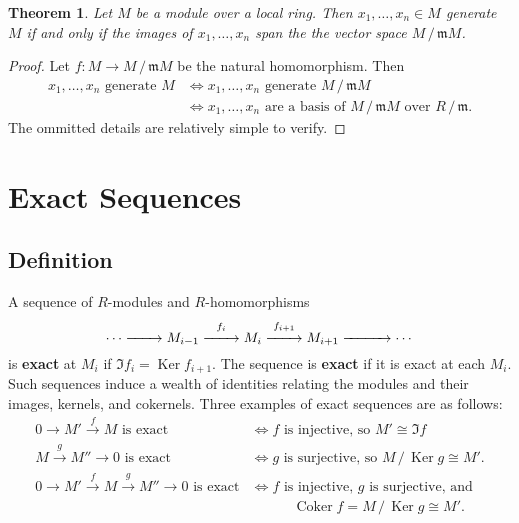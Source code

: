 \documentclass[11pt]{article}
\newtheorem{theorem}{Theorem}
\newcommand{\Ker}{\operatorname{Ker}}
\newcommand{\Coker}{\operatorname{Coker}}
\renewcommand{\longrightarrow}{\xrightarrow{\hspace*{0.7cm}}}
\begin{document}
\begin{adjustwidth}{1cm}{}
	\begin{theorem}
		Let $M$ be a module over a local ring. Then $x_{1}, \ldots, x_{n} \in M$ generate $M$ if and only if the images of $x_{1}, \ldots, x_{n}$ span the the vector space $M \,/\, \mathfrak{m} M$.
	\end{theorem}
	\begin{proof}
		Let $f : M \to M \,/\, \mathfrak{m} M$ be the natural homomorphism. Then
		\begin{align*}
			\text{$x_{1}, \ldots, x_{n}$ generate $M$} &\iff \text{$x_{1}, \ldots, x_{n}$ generate $M \,/\, \mathfrak{m} M$} \\
			&\iff \text{$x_{1}, \ldots, x_{n}$ are a basis of $M \,/\, \mathfrak{m} M$ over $R \,/\, \mathfrak{m}$}.
		\end{align*}
		The ommitted details are relatively simple to verify.
	\end{proof}
\end{adjustwidth}


\newpage


\section{Exact Sequences}


\subsection{Definition}

A sequence of $R$-modules and $R$-homomorphisms
\begin{equation}
	\cdots \longrightarrow M_{i - 1} \stackrel{f_{i}}{\longrightarrow} M_{i} \stackrel{f_{i + 1}}{\longrightarrow} M_{i + 1} \xrightarrow{\hspace*{1cm}} \cdots 
\end{equation}
is \textbf{exact} at $M_{i}$ if $\Im f_{i} = \Ker f_{i + 1}$. The sequence is \textbf{exact} if it is exact at each $M_{i}$. Such sequences induce a wealth of identities relating the modules and their images, kernels, and cokernels. Three examples of exact sequences are as follows:
\begin{align*}
	0 \to M' \stackrel{f}{\to} M \text{ is exact } &\iff \text{$f$ is injective, so $M' \cong \Im f$} \\
	M \stackrel{g}{\to} M'' \to 0 \text{ is exact } &\iff \text{$g$ is surjective, so $M \,/\, \Ker g \cong M'$.} \\
	0 \to M' \stackrel{f}{\to} M \stackrel{g}{\to} M'' \to 0 \text{ is exact} &\iff \text{$f$ is injective, $g$ is surjective, and} \\
	& \quad \qquad \text{$\Coker f = M \,/\, \Ker g \cong M'$}.
\end{align*}
\end{document}
